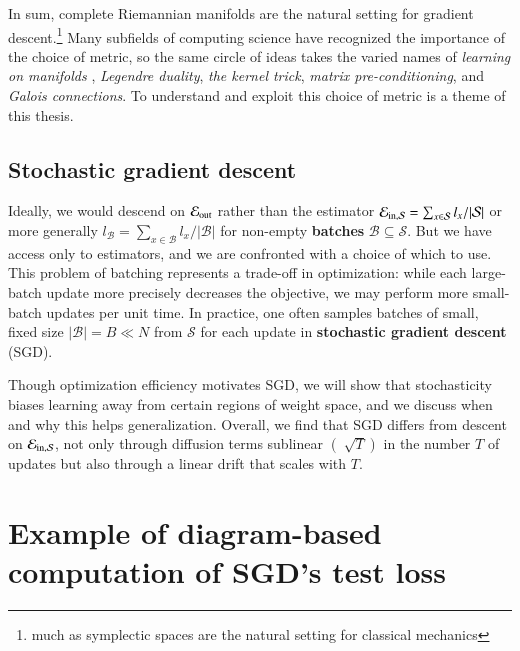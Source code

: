 \documentclass[openany, notitlepage, justified]{tufte-book}
\theoremstyle{plain}
\theoremstyle{definition}
\newcommand{\Bb}{\mathcal{B}}
\newcommand{\Ss}{\mathcal{S}}
\begin{document}
        In sum, complete Riemannian manifolds are the natural
        setting for gradient descent.\footnote{
            much as symplectic spaces are the natural setting for classical
            mechanics
        }
        Many subfields of computing science have recognized the importance
        of the choice of metric,
        so the same circle of ideas takes the varied names of \emph{learning on
        manifolds} \citep{bo13}, \emph{Legendre duality}, \emph{the kernel
        trick}, \emph{matrix pre-conditioning}, and \emph{Galois
        connections}.
        To understand and exploit this choice of metric is a theme of this
        thesis. 

        \subsection{Stochastic gradient descent}

            Ideally, we would descend on $\mathcal{E}_{\text{out}}$ rather than the estimator
            $\Ein = \sum_{x\in\Ss} l_x/|\Ss|$ or more generally $l_\Bb =
            \sum_{x\in\Bb} l_x/|\Bb|$ for non-empty \textbf{batches}
            $\Bb\subseteq\Ss$.  But we have access only to estimators, and we
            are confronted with a choice of which to use.  This problem
            of batching represents a trade-off in optimization: while
            each large-batch update more precisely decreases the objective, we
            may perform more small-batch updates per unit time.  In practice,
            one often samples batches of small, fixed size $|\Bb|=B \ll N$ from
            $\Ss$ for each update in \textbf{stochastic gradient descent}
            (SGD).

            Though optimization efficiency motivates SGD, we will show that
            stochasticity biases learning away from certain regions of weight
            space, and we discuss when and why this helps generalization.
            Overall, we find that SGD differs from descent on $\Ein$, not only
            through diffusion terms sublinear $(\sqrt[]{T})$ in the number $T$
            of updates but also through a linear drift that scales with $T$.

    \section{Example of diagram-based computation of SGD's test loss} \label{subsect:example}
\end{document}
